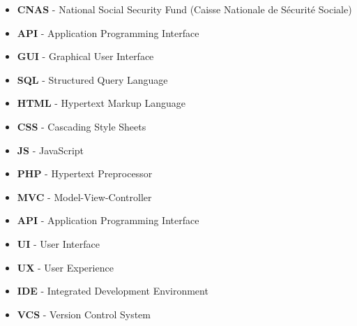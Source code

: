 \documentclass[12pt]{report}
\begin{document}
\begin{itemize}
    \item \textbf{CNAS} - National Social Security Fund (Caisse Nationale de Sécurité Sociale)
    \item \textbf{API} - Application Programming Interface
    \item \textbf{GUI} - Graphical User Interface
    \item \textbf{SQL} - Structured Query Language
    \item \textbf{HTML} - Hypertext Markup Language
    \item \textbf{CSS} - Cascading Style Sheets
    \item \textbf{JS} - JavaScript
    \item \textbf{PHP} - Hypertext Preprocessor
    \item \textbf{MVC} - Model-View-Controller
    \item \textbf{API} - Application Programming Interface
    \item \textbf{UI} - User Interface
    \item \textbf{UX} - User Experience
    \item \textbf{IDE} - Integrated Development Environment
    \item \textbf{VCS} - Version Control System
\end{itemize}










 
\end{document}
